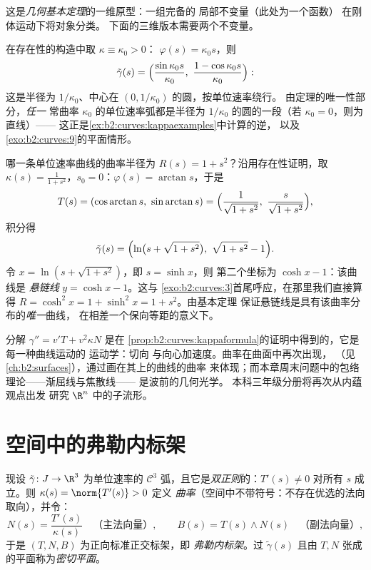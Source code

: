 \begin{remark}
这是\emph{几何基本定理}的一维原型：一组完备的
局部不变量（此处为一个函数）
在刚体运动下将对象分类。
下面的三维版本需要两个不变量。
\end{remark}

\begin{example}[常曲率
即圆]\label{ex:b2:curves:constantkappa}
在存在性的构造中取 $\kappa \equiv \kappa_0 > 0$：
$\varphi(s) = \kappa_0 s$，则
\[
\tilde\gamma(s) = \Bigl(\frac{\sin\kappa_0s}{\kappa_0},\
\frac{1 - \cos\kappa_0s}{\kappa_0}\Bigr) :
\]
这是半径为 $1/\kappa_0$、中心在 $(0,
1/\kappa_0)$ 的圆，按单位速率绕行。
由定理的唯一性部分，\emph{任一}
常曲率 $\kappa_0$ 的单位速率弧都是半径为
$1/\kappa_0$ 的圆的一段（若 $\kappa_0 = 0$，则为直线）——
这正是\cref{ex:b2:curves:kappaexamples}中计算的逆，
以及\cref{exo:b2:curves:9}的平面情形。
\end{example}

\begin{example}[由曲率重建
曲线]\label{ex:b2:curves:reconstruction}
哪一条单位速率曲线的曲率半径为 $R(s) = 1 +
s^2$？沿用存在性证明，取 $\kappa(s) =
\frac1{1+s^2}$，$s_0 = 0$：$\varphi(s) = \arctan s$，于是
\[
T(s) = (\cos\arctan s,\ \sin\arctan s)
= \Bigl(\frac{1}{\sqrt{1+s^2}},\
\frac{s}{\sqrt{1+s^2}}\Bigr),
\]
积分得
\[
\tilde\gamma(s) = \Bigl(\ln\bigl(s + \sqrt{1 + s^2}\bigr),\
\sqrt{1 + s^2} - 1\Bigr).
\]
令 $x = \ln(s + \sqrt{1+s^2})$，即 $s = \sinh x$，则
第二个坐标为 $\cosh x - 1$：该曲线是
\emph{悬链线} $y = \cosh x - 1$。这与
\cref{exo:b2:curves:3}首尾呼应，在那里我们直接算得 $R = \cosh^2 x = 1 +
\sinh^2 x = 1 + s^2$。由基本定理
保证悬链线是具有该曲率分布的\emph{唯一}曲线，
在相差一个保向等距的意义下。
\end{example}

\begin{remark}[曲率的后续应用]
分解 $\gamma'' = v'T + v^2\kappa N$ 是在
\cref{prop:b2:curves:kappaformula}的证明中得到的，它是每一种曲线运动的
运动学：切向
与向心加速度。曲率在曲面中再次出现，
（见\cref{ch:b2:surfaces}），通过画在其上的曲线的曲率
来体现；而本章周末问题中的包络理论——渐屈线与焦散线——
是波前的几何光学。
本科三年级分册将再次从内蕴观点出发
研究 $\R^n$ 中的子流形。
\end{remark}

\section{空间中的弗勒内标架}

现设 $\tilde\gamma \colon J \to \R^3$ 为单位速率的
$\mathcal{C}^3$ 弧，且它是\emph{双正则}的：$T'(s) \neq 0$
对所有 $s$ 成立。则 $\kappa(s) = \norm{T'(s)} > 0$ 定义
\emph{曲率}（空间中不带符号：不存在优选的法向
取向），并令：
\[
N(s) = \frac{T'(s)}{\kappa(s)}
\quad\text{（主法向量）},
\qquad
B(s) = T(s) \wedge N(s)
\quad\text{（副法向量）} ,
\]
于是 $(T, N, B)$ 为正向标准正交标架，即
\emph{弗勒内标架}。过 $\tilde\gamma(s)$ 且由
$T, N$ 张成的平面称为\emph{密切平面}。


